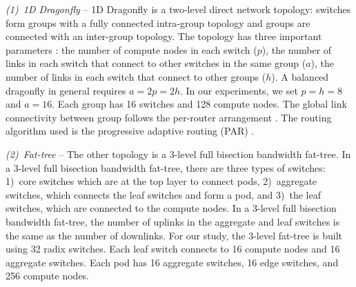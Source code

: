 {\em (1)~1D Dragonfly} -- 1D Dragonfly \cite{Kim2008ISCA}
is a two-level direct network topology: switches form groups with a fully connected
intra-group topology and groups are connected with an inter-group topology.
The topology has three important parameters \cite{Kim2008ISCA}:
the number of compute nodes in each switch ($p$),
the number of links in each switch that connect to other switches in the same group
($a$), the number of links in each switch that connect to other groups ($h$). A balanced dragonfly
in general requires $a = 2p = 2h$. In our experiments, we set $p = h = 8$ and $a = 16$.
Each group has 16 switches and 128 compute nodes. 
The global link connectivity between group follows the per-router arrangement
\cite{Alzaid2020ICS}.
The routing algorithm used is the progressive adaptive routing (PAR) \cite{Kim2008ISCA,Alzaid2020ICS}.

{\em (2)~Fat-tree} -- The other topology is a 3-level full bisection bandwidth
fat-tree.  In a 3-level full bisection bandwidth fat-tree, there are three types
of switches: 1)~core switches which are at the top layer to connect pods,
2)~aggregate switches, which connects the leaf switches and form a pod, and
3)~the leaf switches, which are connected to the compute nodes. In a 3-level
full bisection bandwidth fat-tree, the number of uplinks in the aggregate and
leaf switches is the same as the number of downlinks. For our study, the 3-level
fat-tree is built using 32 radix switches. Each leaf switch connects to 16
compute nodes and 16 aggregate switches. Each pod has 16 aggregate switches, 16
edge switches, and 256 compute nodes.


